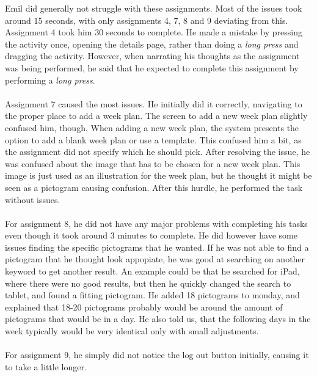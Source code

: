 \noindent
Emil did generally not struggle with these assignments.
Most of the issues took around 15 seconds, with only assignments 4, 7, 8 and 9 deviating from this.
\\
Assignment 4 took him 30 seconds to complete.
He made a mistake by pressing the activity once, opening the details page, rather than doing a \textit{long press} and dragging the activity.
However, when narrating his thoughts as the assignment was being performed, he said that he expected to complete this assignment by performing a \textit{long press}.
\\\\
Assignment 7 caused the most issues. 
He initially did it correctly, navigating to the proper place to add a week plan. 
The screen to add a new week plan slightly confused him, though.
When adding a new week plan, the system presents the option to add a blank week plan or use a template.
This confused him a bit, as the assignment did not specify which he should pick.
After resolving the issue, he was confused about the image that has to be chosen for a new week plan.
This image is just used as an illustration for the week plan, but he thought it might be seen as a pictogram causing confusion.
After this hurdle, he performed the task without issues.
\\\\
For assignment 8, he did not have any major problems with completing his tasks even though it took around 3 minutes to complete.
He did however have some issues finding the specific pictograms that he wanted.
If he was not able to find a pictogram that he thought look appopiate, he was good at searching on another keyword to get another result. 
An example could be that he searched for iPad, where there were no good results, but then he quickly changed the search to tablet, and found a fitting pictogram.
He added 18 pictograms to monday, and explained that 18-20 pictograms probably would be around the amount of pictograms that would be in a day.
He also told us, that the following days in the week typically would be very identical only with small adjustments.
\\\\
For assignment 9, he simply did not notice the log out button initially, causing it to take a little longer.

